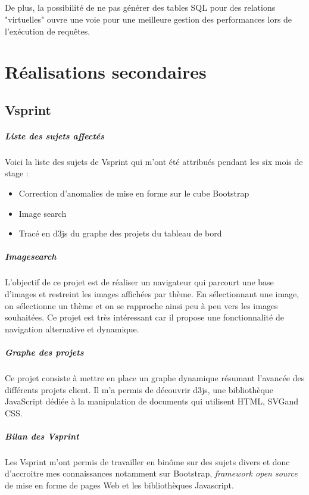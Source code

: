 \documentclass {report}
\begin{document}
\paragraph{}
De plus, la possibilité de ne pas générer des tables SQL pour des relations "virtuelles" ouvre une voie pour une meilleure gestion des performances lors de l'exécution de requêtes.




\chapter{Réalisations secondaires}
\section{Vsprint}
\paragraph{Liste des sujets affectés}
 Voici la liste des sujets de Vsprint qui m'ont été attribués pendant les six mois de stage : 
\begin{itemize}
\item Correction d'anomalies de mise en forme sur le cube Bootstrap
\item Image search
\item Tracé en d3js du graphe des projets du tableau de bord
\end{itemize}

\paragraph{Imagesearch}
L'objectif de ce projet est de réaliser un navigateur qui parcourt une base d'images et restreint les images affichées par thème. En sélectionnant une image, on sélectionne un thème et on se rapproche ainsi peu à peu vers les images souhaitées. Ce projet est très intéressant car il propose une fonctionnalité de navigation alternative et dynamique.

\paragraph{Graphe des projets}
Ce projet consiste à mettre en place un graphe dynamique résumant l'avancée des différents projets client. Il m'a permis de découvrir d3js, une bibliothèque JavaScript dédiée à la manipulation de documents qui utilisent HTML, SVG\footnotemark[1] and CSS.
\paragraph{Bilan des Vsprint}
Les Vsprint m'ont permis de travailler en binôme sur des sujets divers et donc d'accroitre mes connaissances notamment sur Bootstrap, \textit{framework open source} de mise en forme de pages Web et les bibliothèques Javascript.
\end{document}
